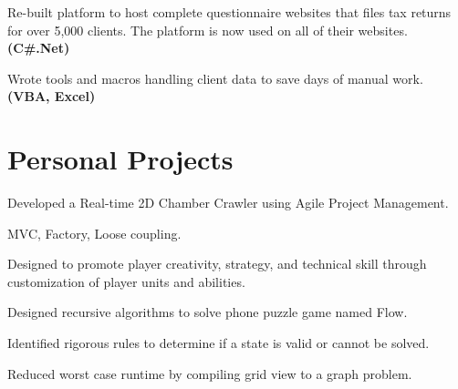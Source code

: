\documentclass[letterpaper]{kevin-resume} %
\begin{document}
\begin{minipage}[t]{0.66\textwidth}
\sectionspace %


\begin{tightitemize}
	\item Re-built platform to host complete questionnaire websites that files tax returns for over 5,000 clients. The platform is now used on all of their websites. \textbf{(C\#.Net)}
	\item Wrote tools and macros handling client data to save days of manual work. \textbf{(VBA, Excel)}
\end{tightitemize}

\sectionspace %


\section{Personal Projects}

\begin{tightitemize}
	\item Developed a Real-time 2D Chamber Crawler using Agile Project Management.
	\item MVC, Factory, Loose coupling.
	\item Designed to promote player creativity, strategy, and technical skill through customization of player units and abilities.
\end{tightitemize}

\sectionspace %


\begin{tightitemize}
	\item Designed recursive algorithms to solve phone puzzle game named Flow.
 	\item Identified rigorous rules to determine if a state is valid or cannot be solved.
 	\item Reduced worst case runtime by compiling grid view to a graph problem. 
\end{tightitemize}


\end{minipage}
\end{document}
